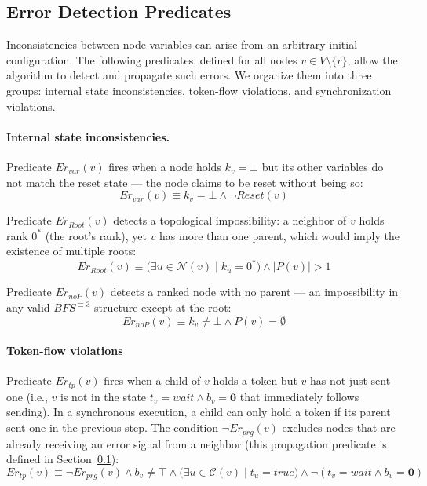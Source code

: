 \documentclass[a4paper, 12pt]{article}
\newcommand{\Neig}{\mathcal{N}}
\newcommand{\rk}{k}
\begin{document}
\subsection{Error Detection Predicates}
\label{subsub:ED}

Inconsistencies between node variables can arise from an arbitrary initial configuration.
The following predicates, defined for all nodes $v \in V \setminus \{r\}$, allow the
algorithm to detect and propagate such errors. We organize them into three groups:
internal state inconsistencies, token-flow violations, and synchronization violations.

\paragraph*{Internal state inconsistencies.}

Predicate $Er_{var}(v)$ fires when a node holds $\rk_v = \bot$ but its other variables
do not match the reset state — the node claims to be reset without being so:
\begin{equation}
    Er_{var}(v) \equiv \rk_v = \bot \wedge \neg \mathit{Reset}(v)
    \label{eq:erRst}
\end{equation}

Predicate $Er_{Root}(v)$ detects a topological impossibility: a neighbor of $v$ holds
rank $0^*$ (the root's rank), yet $v$ has more than one parent, which would imply the
existence of multiple roots:
\begin{equation}
    Er_{Root}(v) \equiv \bigl(\exists u \in \Neig(v) \mid \rk_u = 0^*\bigr) \wedge |P(v)| > 1
\end{equation}

Predicate $Er_{noP}(v)$ detects a ranked node with no parent — an impossibility in any
valid $BFS^{\equiv 3}$ structure except at the root:
\begin{equation}
    Er_{noP}(v) \equiv \rk_v \neq \bot \wedge P(v) = \emptyset
\end{equation}

\paragraph*{Token-flow violations}

Predicate $Er_{tp}(v)$ fires when a child of $v$ holds a token but $v$ has not
just sent one (i.e., $v$ is not in the state $t_v = \mathit{wait} \wedge b_v = \mathbf{0}$
that immediately follows sending). In a synchronous execution, a child can only
hold a token if its parent sent one in the previous step. The condition
$\neg Er_{prg}(v)$ excludes nodes that are already receiving an error signal
from a neighbor (this propagation predicate is defined in
Section~\ref{subsub:ED}):
\begin{equation}
    Er_{tp}(v) \equiv \neg Er_{prg}(v) \wedge b_v \neq \top
    \wedge \bigl(\exists u \in \mathcal{C}(v) \mid t_u = \mathit{true}\bigr)
    \wedge \neg(t_v = \mathit{wait} \wedge b_v = \mathbf{0})
    \label{eq:ertp}
\end{equation}
\end{document}

